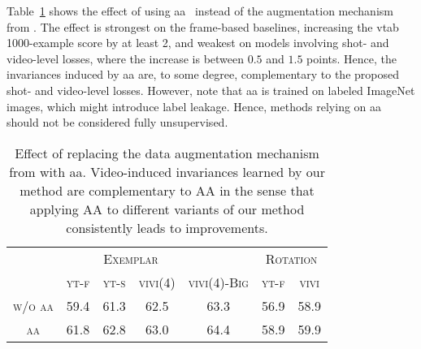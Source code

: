 \documentclass[10pt,twocolumn,letterpaper]{article}
\renewcommand{\paragraph}[1]{\noindent{\bf #1}\quad}
\begin{document}
\paragraph{Effect of AutoAugment (AA)} Table~\ref{tab:autoaugment} shows the effect of using \gls{aa}~\cite{cubuk2018autoaugment} instead of the augmentation mechanism from \cite{szegedy2015going}. The effect is strongest on the frame-based baselines, increasing the \gls{vtab} 1000-example score by at least 2, and weakest on models involving shot- and video-level losses, where the increase is between $0.5$ and $1.5$ points. Hence, the invariances induced by \gls{aa} are, to some degree, complementary to the proposed shot- and video-level losses. However, note that \gls{aa} is trained on labeled ImageNet images, which might introduce label leakage.
Hence, methods relying on \gls{aa} should not be considered fully unsupervised.

\begin{table}
    \centering
    \small
    \small
\setlength{\tabcolsep}{4pt}
\setlength{\extrarowheight}{5pt}
\renewcommand{\arraystretch}{0.75}
\begin{tabular}{ccccccc}
\toprule
\multicolumn{5}{c}{\textsc{Exemplar}} & \multicolumn{2}{c}{\textsc{Rotation}}  \\
\cmidrule(r){2-5}
\cmidrule(r){6-7}
& \textsc{yt-f} & \textsc{yt-s} & \textsc{vivi(4)} & \textsc{vivi(4)-Big} & \textsc{yt-f} & \textsc{vivi}  \\
\midrule
\textsc{w/o aa} &     59.4 &     61.3 &       62.5 &           63.3 &     56.9 &        58.9 \\
\textsc{aa}  & 61.8 & 62.8 &       63.0 &           64.4 &     58.9 &    59.9 \\
\bottomrule
\end{tabular}     \caption{Effect of replacing the data augmentation mechanism from \cite{szegedy2015going} with \gls{aa}. Video-induced invariances learned by our method are complementary to AA in the sense that applying AA to different variants of our method consistently leads to improvements.}\vspace{-4mm}
    \label{tab:autoaugment}
\end{table}
\end{document}
